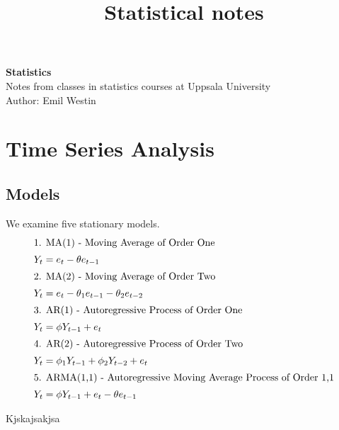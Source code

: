 \documentclass[11pt]{article}
\begin{document}
\title{Statistical notes}

\thispagestyle{empty}

\begin{center}
{\LARGE \bf Statistics}\\
Notes from classes in statistics courses at Uppsala University \\
Author: Emil Westin
\end{center}

\section{Time Series Analysis}
\subsection{Models}

We examine five stationary models.
\begin{align}
\intertext{1. MA(1) - Moving Average of Order One}
Y_t & = e_t - \theta e_{t-1} \label{MA1} \\
\intertext{2. MA(2) - Moving Average of Order Two}
Y_t & = e_t - \theta_1 e_{t-1} -  \theta_2 e_{t-2} \label{MA2} \\
\intertext{3. AR(1) - Autoregressive Process of Order One}
Y_t & = \phi Y_{t-1} + e_t \label{AR1} \\
\intertext{4. AR(2) - Autoregressive Process of Order Two}
Y_t & = \phi_1 Y_{t-1} + \phi_2 Y_{t-2} + e_t \label{AR2} \\
\intertext{5. ARMA(1,1) - Autoregressive Moving Average Process of Order 1,1}
Y_t & = \phi Y_{t-1} + e_t - \theta e_{t-1} \label{ARMA} 
\end{align}

Kjskajsakjsa
\end{document}
